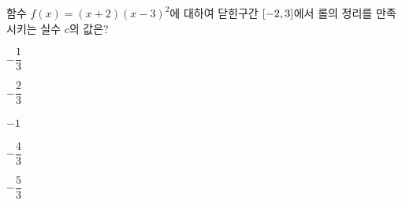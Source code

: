 함수 $f(x)=(x+2)(x-3)^2$에 대하여 닫힌구간 $[-2{,}\mkern3mu\mathopen{}3]$에서 롤의 정리를 만족시키는 실수 $c$의 값은?
\begin{choices32}{\rule[-3ex]{0pt}{8ex}$-\dfrac{1}{3}$}{\rule[-3ex]{0pt}{8ex}$-\dfrac{2}{3}$}{\rule[-3ex]{0pt}{8ex}$-1$}{\rule[-3ex]{0pt}{8ex}$-\dfrac{4}{3}$}{\rule[-3ex]{0pt}{8ex}$-\dfrac{5}{3}$}\end{choices32}
